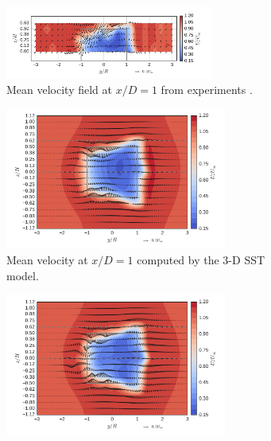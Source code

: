 \documentclass[aip,graphicx]{revtex4-1}
\begin{document}
\begin{figure}
    \centering
    \begin{subfigure}[b]{\textwidth}
        \centering 
        
        \includegraphics[clip, trim=0 0.1in 0 0.2in,
        width=0.75\textwidth]{figures/meancontquiv_exp}
        
        \caption{Mean velocity field at $x/D=1$ from experiments
            \cite{Bachant2015-RVAT-Re-dep-data}.}
        
        \label{fig:meancontquiv-exp}
    \end{subfigure}

    \begin{subfigure}[b]{\textwidth}
        \centering 
        
        \includegraphics[clip, trim=0 0.2in 0 0.15in,
        width=0.8\textwidth]{figures/meancontquiv_kOmegaSST}
        
        \caption{Mean velocity at $x/D=1$ computed by the 3-D SST model.}
        
        \label{fig:meancontquiv-SST}
    \end{subfigure}

    \begin{subfigure}[b]{\textwidth}
        \centering 
        
        \includegraphics[clip, trim=0 0.2in 0 0.15in,
        width=0.8\textwidth]{figures/meancontquiv_SpalartAllmaras}
        

\end{subfigure}
\end{figure}
\end{document}
